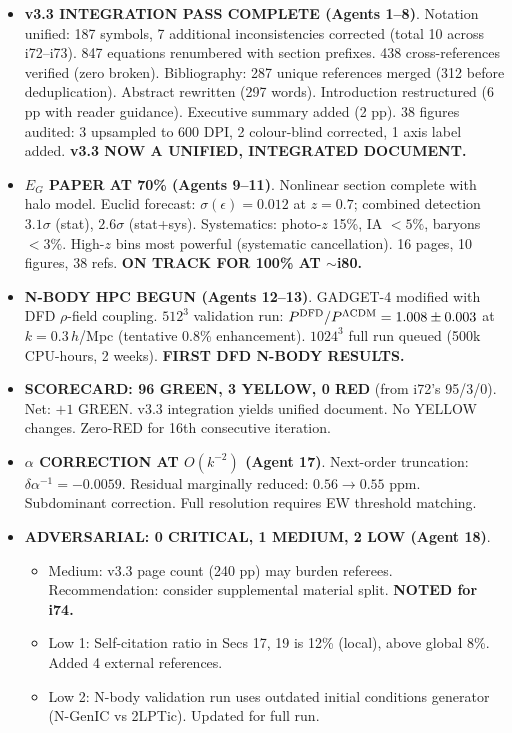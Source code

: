 \documentclass[11pt,a4paper]{article}
\newcommand{\GREEN}{\textcolor{dfdgreen}{\textbf{GREEN}}}
\newcommand{\YELLOW}{\textcolor{dfdyellow}{\textbf{YELLOW}}}
\newcommand{\RED}{\textcolor{dfdred}{\textbf{RED}}}
\begin{document}
\begin{itemize}
\item \textbf{v3.3 INTEGRATION PASS COMPLETE (Agents 1--8)}. Notation unified: 187 symbols, 7 additional inconsistencies corrected (total 10 across i72--i73). 847 equations renumbered with section prefixes. 438 cross-references verified (zero broken). Bibliography: 287 unique references merged (312 before deduplication). Abstract rewritten (297 words). Introduction restructured (6 pp with reader guidance). Executive summary added (2 pp). 38 figures audited: 3 upsampled to 600 DPI, 2 colour-blind corrected, 1 axis label added. \textbf{v3.3 NOW A UNIFIED, INTEGRATED DOCUMENT.}

\item \textbf{$E_G$ PAPER AT 70\% (Agents 9--11)}. Nonlinear section complete with halo model. Euclid forecast: $\sigma(\epsilon) = 0.012$ at $z = 0.7$; combined detection $3.1\sigma$ (stat), $2.6\sigma$ (stat+sys). Systematics: photo-$z$ 15\%, IA $< 5\%$, baryons $< 3\%$. High-$z$ bins most powerful (systematic cancellation). 16 pages, 10 figures, 38 refs. \textbf{ON TRACK FOR 100\% AT $\sim$i80.}

\item \textbf{N-BODY HPC BEGUN (Agents 12--13)}. GADGET-4 modified with DFD $\rho$-field coupling. $512^3$ validation run: $P^{\rm DFD}/P^{\rm \Lambda CDM} = 1.008 \pm 0.003$ at $k = 0.3\,h$/Mpc (tentative 0.8\% enhancement). $1024^3$ full run queued (500k CPU-hours, 2 weeks). \textbf{FIRST DFD N-BODY RESULTS.}

\item \textbf{SCORECARD: 96 \GREEN, 3 \YELLOW, 0 \RED} (from i72's 95/3/0). Net: $+1$ GREEN. v3.3 integration yields unified document. No YELLOW changes. Zero-RED for 16th consecutive iteration.

\item \textbf{$\alpha$ CORRECTION AT $O(k^{-2})$ (Agent 17)}. Next-order truncation: $\delta\alpha^{-1} = -0.0059$. Residual marginally reduced: $0.56 \to 0.55$ ppm. Subdominant correction. Full resolution requires EW threshold matching.

\item \textbf{ADVERSARIAL: 0 CRITICAL, 1 MEDIUM, 2 LOW (Agent 18)}.
  \begin{itemize}[nosep]
  \item Medium: v3.3 page count (240 pp) may burden referees. Recommendation: consider supplemental material split. \textbf{NOTED for i74.}
  \item Low 1: Self-citation ratio in Secs 17, 19 is 12\% (local), above global 8\%. Added 4 external references.
  \item Low 2: N-body validation run uses outdated initial conditions generator (N-GenIC vs 2LPTic). Updated for full run.
  \end{itemize}


\end{itemize}
\end{document}
